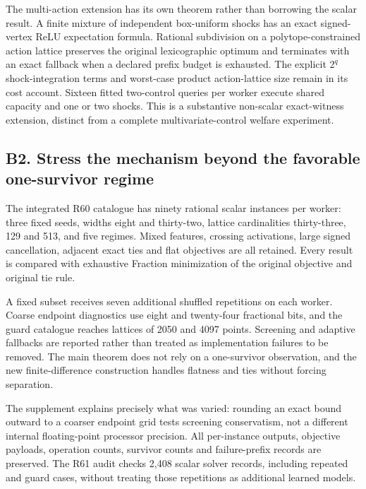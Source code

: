 \documentclass[ecta,nameyear,draft]{econsocart}
\begin{document}
The multi-action extension has its own theorem rather than borrowing the
scalar result. A finite mixture of independent box-uniform shocks has an
exact signed-vertex ReLU expectation formula. Rational subdivision on a
polytope-constrained action lattice preserves the original lexicographic
optimum and terminates with an exact fallback when a declared prefix
budget is exhausted. The explicit \(2^q\) shock-integration terms and
worst-case product action-lattice size remain in its cost account.
Sixteen fitted two-control queries per worker execute shared capacity
and one or two shocks. This is a substantive non-scalar exact-witness
extension, distinct from a complete multivariate-control welfare
experiment.

\hypertarget{b2.-stress-the-mechanism-beyond-the-favorable-one-survivor-regime}{%
\subsection{B2. Stress the mechanism beyond the favorable one-survivor
regime}\label{b2.-stress-the-mechanism-beyond-the-favorable-one-survivor-regime}}

The integrated R60 catalogue has ninety rational scalar instances per
worker: three fixed seeds, widths eight and thirty-two, lattice
cardinalities thirty-three, 129 and 513, and five regimes. Mixed
features, crossing activations, large signed cancellation, adjacent
exact ties and flat objectives are all retained. Every result is
compared with exhaustive Fraction minimization of the original objective
and original tie rule.

A fixed subset receives seven additional shuffled repetitions on each
worker. Coarse endpoint diagnostics use eight and twenty-four fractional
bits, and the guard catalogue reaches lattices of 2050 and 4097 points.
Screening and adaptive fallbacks are reported rather than treated as
implementation failures to be removed. The main theorem does not rely on
a one-survivor observation, and the new finite-difference construction
handles flatness and ties without forcing separation.

The supplement explains precisely what was varied: rounding an exact
bound outward to a coarser endpoint grid tests screening conservatism,
not a different internal floating-point processor precision. All
per-instance outputs, objective payloads, operation counts, survivor
counts and failure-prefix records are preserved. The R61 audit checks
2,408 scalar solver records, including repeated and guard cases, without
treating those repetitions as additional learned models.
\end{document}
